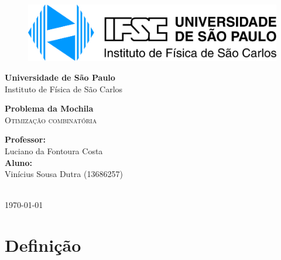 \documentclass{article}
\newcommand{\theauthor}{Vinícius Sousa Dutra (13686257)}
\newcommand{\thetitle}{Problema da Mochila}
\begin{document}
\begin{titlepage}
    \begin{center}
        \begin{figure}[htb!]
            \centering
            \includegraphics[width=150mm]{images/ifsc_logo.jpg}
        \end{figure}
        \vspace{20pt}
        \LARGE{\textbf{Universidade de São Paulo}}\\
        \LARGE{Instituto de Física de São Carlos}\\

        \vspace{150pt}

        
        \LARGE{\textbf{{\thetitle}}} 
        \\ 
        \textsc{\LARGE Otimização combinatória}
        \\
        
        
        \vspace{125pt}
        \begin{minipage}{\textwidth}
            \begin{flushleft} \large
                \textbf{Professor:}\\
                Luciano da Fontoura Costa\\[0.8cm]
                \textbf{Aluno:}\\
                \theauthor
                
                \end{flushleft}
                \end{minipage}\\[1 cm]
        \vspace{30pt}
        \vspace{\fill}  
        \Large {\today}

    \end{center}
\end{titlepage}

\newpage
\tableofcontents
\listoffigures
\listoftables
\listoflistings
\newpage
\section{Definição}
\end{document}
